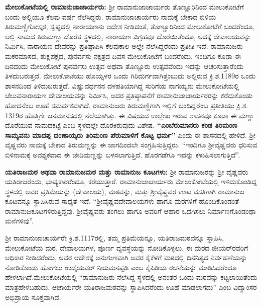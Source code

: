 \textbf{ಮೇಲುಕೋಟೆಯಲ್ಲಿ ರಾಮಾನುಜಾಚಾರ್ಯರು:} ಶ‍್ರೀ ರಾಮಾನುಜಾಚಾರ್ಯರು ತೊಣ್ಣೂರಿನಿಂದ ಮೇಲುಕೋಟೆಗೆ ಬಂದು ಅಲ್ಲಿಯೂ ಕೆಲವು ವರ್ಷ ನೆಲೆಸಿದ್ದರು. ರಾಮಾನುಜಾಚಾರ್ಯರು ನಾಮಕ್ಕೆ ಬೇಕಾದ ಬಿಳಿಯ ತಿರುಮಣ್ಣಿಗೋಸ್ಕರ, ಸ್ವಪ್ನದಲ್ಲಿ ನಾರಾಯಣನು ಆದೇಶ ನೀಡಿದಂತೆ, ತೊಣ್ಣೂರಿನಿಂದ ಮೇಲುಕೋಟೆಗೆ ಬಂದರೆಂದೂ, ಅಲ್ಲಿ ನಾಮದ ತಿರುಮಣ್ಣು ದೊರೆತ ಸ್ಥಳದಲ್ಲಿ, ನಾರಾಯಣ ವಿಗ್ರಹವೂ ದೊರೆಯಿತೆಂದೂ, ಅದಕ್ಕೆ ದೇವಾಲಯವನ್ನು ನಿರ್ಮಿಸಿ, ನಾರಾಯಣ ದೇವರನ್ನು ಪ್ರತಿಷ್ಠಾಪಿಸಿ ಕೆಲವುಕಾಲ ಅಲ್ಲೇ ನೆಲೆಸಿದ್ದರೆಂದು ಪ್ರತೀತಿ ಇದೆ. ರಾಮಾನುಜರು ಮಕರಮಾಸದ, ಶುಕ್ಲಪಕ್ಷದ, ಪುನರ್ವಸು ನಕ್ಷತ್ರದ ದಿವಸ ಮೇಲುಕೋಟೆಗೆ ಬಂದರೆಂದು, ಇಂದಿಗೂ ಕೂಡಾ ಈ ದಿನದಂದು ಮೇಲುಕೋಟೆ ಪುನರ್ವಸು ಉತ್ಸವ ಅಥವಾ ತೊಣ್ಣೂರು ಉತ್ಸವವೆಂದು ಇದನ್ನು ಆಚರಿಸುತ್ತಾರೆಂದು ತಿಳದುಬರುತ್ತದೆ. ಮೇಲುಕೋಟೆಯು ಹೊಯ್ಸಳರ ಒಂದು ಗಿರಿದುರ್ಗವಾಗಿತ್ತೆಂಬುದು ಅಲ್ಲಿರುವ ಕ್ರಿ.ಶ.1189ರ ಒಂದು ಶಾಸನದಿಂದ ತಿಳಿದುಬರುತ್ತದೆ. ವಿಷ್ಣುವರ್ಧನನ ದಳಪತಿಯಾಗಿದ್ದ ಸುರಿಗೆಯ ನಾಗಯ್ಯನು ಮೇಲುಕೋಟೆಯಲ್ಲಿ ಚೆಲುವನಾರಾಯಣ ದೇವಾಲಯವನ್ನು ನಿರ್ಮಿಸಿ, ಅದರ ಪ್ರತಿಷ್ಠಾಪನೆಗೆ ರಾಮಾನುಜಾಚಾರ್ಯರರನ್ನು ಕರೆದುಕೊಂಡು ಹೋದನೆಂಬ ಊಹೆ ಸಮರ್ಪಕವಾಗಿದೆ. ರಾಮಾನುಜರು ತಿರುಮಣ್ಣಿಗಾಗಿ ಇಲ್ಲಿಗೆ ಬಂದಿದ್ದರೆಂಬ ಪ್ರತೀತಿಯು ಕ್ರಿ.ಶ. 1319ರ ಹೊತ್ತಿಗೇ ಜನಮಾನಸದಲ್ಲಿ ನೆಲೆಯಾಗಿತ್ತು. ಈ ವಿಷಯದ ಉಲ್ಲೇಖ ಇರುವ ಶಾಸನವೂ ಕೂಡಾ ಈ ಮಣ್ಣು ದೊರೆಯುವ ನಾಮದಕಟ್ಟೆ ಎಂಬ ಸ್ಥಳದಲ್ಲೇ ದೊರಕಿರುವುದು ವಿಶೇಷ. \textbf{“ಎಂಬೆರುಮಾನರು ಕಂಡ ತಿರಿಮಂಣ ಸಾಮ್ಯವನು ಮಾದಪ್ಪ ದಂಣಾಯ್ಕರು ತಿರಿಮಂಣ ಪೆರುಮಾಳಿಗೆ ಕೊಟ್ಟ ಧರ್ಮ”} ಎಂದು ಈ ಶಾಸನದಲ್ಲಿ ಹೇಳಿದೆ. ಶ‍್ರೀ ವೈಷ್ಣವರು ನಾಮಕ್ಕೆ ಬೇಕಾದ ತಿರುಮಣ್ಣನ್ನು ಈ ಜಾಗದಿಂದಲೇ ಸಂಗ್ರಹಿಸುತ್ತಿದ್ದರು. “ಇಂದಿಗೂ ಶ‍್ರೀವೈಷ್ಣವರು ಧರಿಸುವ ಬಿಳಿನಾಮಕ್ಕೆ ಅವಶ್ಯಕವಾದ ಈ ಜೇಡಿಮಣ್ಣನ್ನು ಬಳಸಲಾಗುತ್ತಿದೆ. ಹೊರಗಡೆಗೂ ಇದನ್ನು ಕಳುಹಿಸಲಾಗುತ್ತಿದೆ”.

\newpage

\textbf{ಯತಿರಾಜಮಠ ಅಥವಾ ರಾಮಾನುಜಮಠ ಮತ್ತು ರಾಮಾನುಜ ಕೂಟಗಳು:} ಶ‍್ರೀ ರಾಮಾನುಜರನ್ನು ಶ‍್ರೀ ವೈಷ್ಣವರು ಯತಿರಾಜರೆಂದು, ಭಾಷ್ಯಕಾರರೆಂದೂ, ಕರೆಯುತ್ತಾರೆ. ರಾಮಾನುಜಾಚಾರ್ಯರು ಮೇಲುಕೋಟೆಯಲ್ಲಿ ಇಳಿದುಕೊಂಡಿದ್ದ ಸ್ಥಳದಲ್ಲಿ ಅವರ ಪ್ರತಿಮೆಯನ್ನು (ದೇವಾಲಯ), ಮಠವನ್ನು, ಮತ್ತು ಶ‍್ರೀವೈಷ್ಣವರ ಊಟ ವಸತಿಗಾಗಿ ರಾಮಾನುಜ ಕೂಟವನ್ನೂ ಸ್ಥಾಪಿಸಿರುವ ಸಾಧ್ಯತೆ ಇದೆ. “ಶ‍್ರೀವೈಷ್ಣವದೇವಾಲಯಗಳು ಹಾಗೂ ಮಠಗಳಿಗೆ ಹೊಂದಿಕೊಂಡಂತೆ ರಾಮಾನುಜಕೂಟಗಳಿರುತ್ತಿದ್ದವು. ಶ‍್ರೀವೈಷ್ಣವರು ತಂಗಲು ಹಾಗೂ ಅವರಿಗೆ ಆಹಾರ ಒದಗಿಸಲು ನಿರ್ಮಾಣಗೊಂಡಂಥಾ ಮನೆಗಳಿವು”.

ಶ‍್ರೀ ರಾಮಾನುಜಾಚಾರ್ಯರೇ ಕ್ರಿ.ಶ.1117ರಲ್ಲಿ, ತಮ್ಮ ಪ್ರತಿಮೆಯನ್ನೂ, ಯತಿರಾಜಮಠವನ್ನೂ ಸ್ಥಾಪಿಸಿ, ಮೇಲುಕೋಟೆಯ ಮಠ, ದೇವಾಲಯಗಳ, ಪೂರ್ಣ ವ್ಯವಸ್ಥೆಯನ್ನು ನೋಡಿಕೊಳ್ಳಲು, ಈ ಮಠದ ಜೀಯರ್​ರವರಿಗೆ ಅಧಿಕಾರ ನೀಡಿದರೆಂದು, ಅವರ ಆದೇಶಕ್ಕೆ ಅನುಗುಣವಾಗಿ ಅವರ ಕೈಕೆಳಗೆ ಮಠದಲ್ಲಿ ದಿನನಿತ್ಯದ ನಿರ್ವಹಣೆಯನ್ನು ನೋಡಿಕೊಂಡು ಹೋಗಲು ಉಡೈಯವರ್​ ನಿಯಮನಪ್ಪಡಿ ಎಂಬ ಕೈಪಿಡಿಯ ರಚನೆಯನ್ನು ಮಾಡಿಸಿದರೆಂದೂ ಹೇಳಲಾಗಿದೆ.\break ಮೇಲುಕೋಟೆಯಲ್ಲಿ “ರಾಮಾನುಜರು ನೆಲೆಸಿದ್ದ ಸ್ಥಳದಲ್ಲಿ ಅನಂತರ ಒಂದು ಮಠವನ್ನು ಕಟ್ಟಲಾಯಿತೆಂದು ಮಾತ್ರ\break ಹೇಳಬಹುದು. ಆಚಾರ್ಯರೇ ಯತಿರಾಜಮಠವನ್ನು ಸ್ಥಾಪಿಸಿದರೆಂದು ಊಹೆ ಮಾಡಲಾಗದು” ಎಂಬ ವಿದ್ವಾಂಸರ ಅಭಿಪ್ರಾಯ ಸೂಕ್ತವಾಗಿದೆ.

